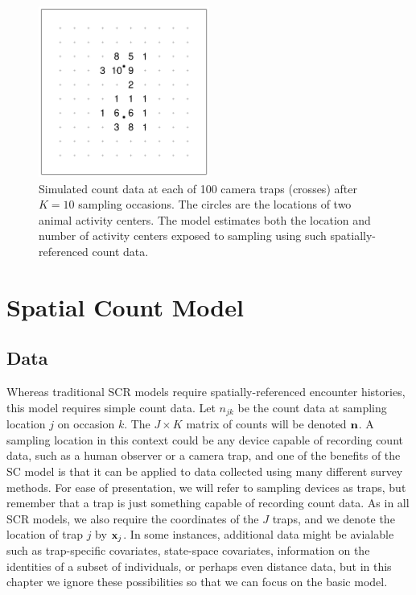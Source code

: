 \begin{figure}%
\centering
\includegraphics[width=0.5\textwidth]{Ch18-Unmarked/figs/heuristic}
\caption{Simulated count data at each of 100 camera traps
  (crosses) after $K=10$ sampling occasions. The circles are the
  locations of two animal activity centers. The
  \citet{chandler_royle:2012} model estimates %
  both the location and number of activity centers exposed to
  sampling using such spatially-referenced count data.}
\label{chapt-unmarked.fig.heur}
\end{figure}





\section{Spatial Count Model}

\subsection{Data}

Whereas traditional SCR models require spatially-referenced
encounter histories, this model requires simple count data.
Let $n_{jk}$ be the count data at sampling location $j$ %
on occasion $k$. %
The $J \times K$ matrix of
counts will be denoted $\bf{n}$. A sampling location in this context
could be any device capable of recording count data, such as a
human observer or a camera trap, and
one of the benefits of the SC model is that it
can be applied to data collected using many different survey
methods. For ease of presentation, we will refer to sampling devices
as traps, but remember that a trap is just something capable of
recording count data. As in all SCR models, we also require the
coordinates of the $J$ traps, and we denote the location of trap $j$
by ${\bf x}_j$. In some instances, additional data might be avialable such as
trap-specific covariates, state-space covariates,
information on the identities of a subset of individuals, or perhaps
even distance data, but in this chapter we ignore these %
possibilities so that we can focus on the basic model.

